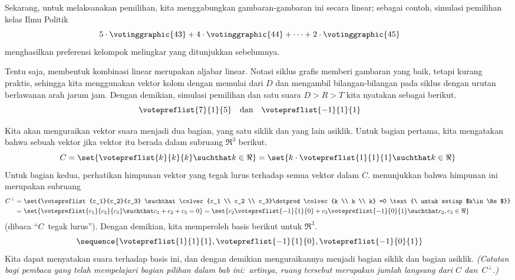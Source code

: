 Sekarang, untuk melaksanakan pemilihan, kita menggabungkan gambaran-gambaran ini secara linear;
sebagai contoh, simulasi pemilihan kelas Ilmu Politik
\begin{equation*}
  5\cdot \votinggraphic{43}
  +4\cdot\votinggraphic{44}
  +\dots+2\cdot\votinggraphic{45}
\tag*{}\end{equation*}
menghasilkan preferensi kelompok melingkar yang ditunjukkan sebelumnya.

Tentu saja, membentuk kombinasi linear merupakan aljabar linear.
Notasi siklus grafis memberi gambaran yang baik, tetapi kurang praktis, sehingga kita
menggunakan vektor kolom dengan memulai dari $D$ dan
mengambil bilangan-bilangan pada siklus dengan urutan berlawanan arah jarum jam.
Dengan demikian, simulasi pemilihan dan satu suara $D>R>T$ kita nyatakan sebagai berikut.
\begin{equation*}
  \votepreflist{7}{1}{5}
  \quad\text{dan}\quad
  \votepreflist{-1}{1}{1}
\tag*{}\end{equation*}

Kita akan
menguraikan vektor suara menjadi dua bagian, yang satu
siklik dan yang lain asiklik.
Untuk bagian pertama,
kita mengatakan bahwa sebuah vektor  jika vektor itu berada dalam
subruang $\Re^3$ berikut.
\begin{equation*}
  C
  =\set{\votepreflist{k}{k}{k} \suchthat k \in\Re}
  =\set{k\cdot\votepreflist{1}{1}{1} \suchthat k \in\Re}
\end{equation*}
Untuk bagian kedua, perhatikan himpunan
vektor yang
tegak lurus terhadap semua vektor dalam $C$.
 menunjukkan bahwa himpunan ini merupakan subruang
\begin{align*}
  C^\perp &=\set{\votepreflist{c_1}{c_2}{c_3} \suchthat 
                 \colvec{c_1 \\ c_2 \\ c_3}\dotprod\colvec{k \\ k \\ k} =0
                 \text{\ untuk setiap $k\in\Re$}}             \\
          &=\set{\votepreflist{c_1}{c_2}{c_3} \suchthat 
                 c_1+c_2+c_3=0}                                         
          =\set{c_2\votepreflist{-1}{1}{0}
                +c_3\votepreflist{-1}{0}{1} \suchthat  c_2,c_3\in\Re}
\end{align*}
(dibaca ``$C$~tegak lurus'').
Dengan demikian, kita memperoleh basis berikut untuk $\Re^3$.
\begin{equation*}
 \sequence{\votepreflist{1}{1}{1},
             \votepreflist{-1}{1}{0},
             \votepreflist{-1}{0}{1}}
\tag*{}\end{equation*}
Kita dapat menyatakan suara terhadap basis ini,
dan dengan demikian menguraikannya menjadi bagian siklik dan bagian asiklik.
\textit{(Catatan bagi pembaca yang telah mempelajari bagian pilihan
dalam bab ini:~artinya, ruang tersebut merupakan jumlah langsung dari $C$ dan~$C^\perp$.)}

